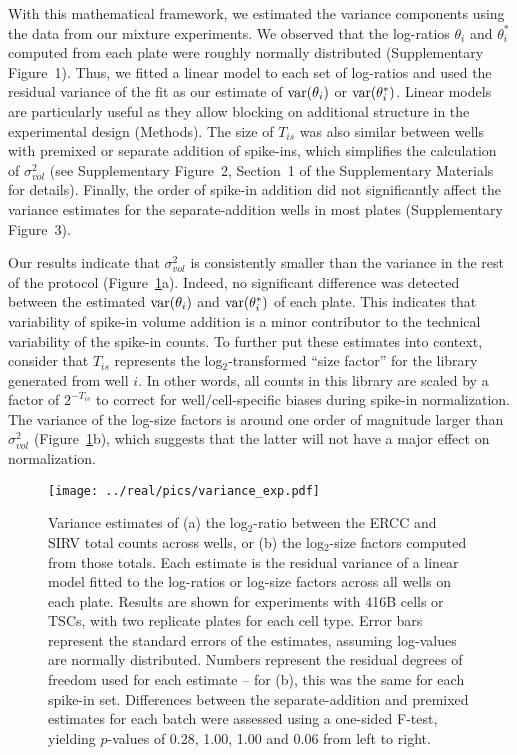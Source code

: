 \documentclass{article}
\newcommand{\suppfignorm}{1}
\newcommand{\suppfigtotals}{2}
\newcommand{\suppfigorder}{3}
\newcommand{\suppsecmath}{1}
\begin{document}
With this mathematical framework, we estimated the variance components using the data from our mixture experiments.
We observed that the log-ratios $\theta_i$ and $\theta^*_i$ computed from each plate were roughly normally distributed (Supplementary Figure~\suppfignorm{}).
Thus, we fitted a linear model to each set of log-ratios and used the residual variance of the fit as our estimate of $\mbox{var}(\theta_i)$ or $\mbox{var}(\theta^*_i)$.
Linear models are particularly useful as they allow blocking on additional structure in the experimental design (Methods).
The size of $T_{is}$ was also similar between wells with premixed or separate addition of spike-ins, which simplifies the calculation of $\sigma^2_{vol}$ (see Supplementary Figure~\suppfigtotals{}, Section~\suppsecmath{} of the Supplementary Materials for details).
Finally, the order of spike-in addition did not significantly affect the variance estimates for the separate-addition wells in most plates (Supplementary Figure~\suppfigorder{}).

Our results indicate that $\sigma^2_{vol}$ is consistently smaller than the variance in the rest of the protocol (Figure~\ref{fig:varestimates}a).
Indeed, no significant difference was detected between the estimated $\mbox{var}(\theta_i)$ and $\mbox{var}(\theta^*_i)$ of each plate.
This indicates that variability of spike-in volume addition is a minor contributor to the technical variability of the spike-in counts.
To further put these estimates into context, consider that $T_{is}$ represents the log$_2$-transformed ``size factor'' for the library generated from well $i$.
In other words, all counts in this library are scaled by a factor of $2^{-T_{is}}$ to correct for well/cell-specific biases during spike-in normalization.
The variance of the log-size factors is around one order of magnitude larger than $\sigma^2_{vol}$ (Figure~\ref{fig:varestimates}b), which suggests that the latter will not have a major effect on normalization.

\begin{figure}[btp]
    \begin{center}
        \texttt{[image: ../real/pics/variance\_exp.pdf]}
    \end{center}
    \caption{Variance estimates of (a) the log$_2$-ratio between the ERCC and SIRV total counts across wells, or (b) the log$_2$-size factors computed from those totals.
        Each estimate is the residual variance of a linear model fitted to the log-ratios or log-size factors across all wells on each plate.
        Results are shown for experiments with 416B cells or TSCs, with two replicate plates for each cell type.
        Error bars represent the standard errors of the estimates, assuming log-values are normally distributed.
        Numbers represent the residual degrees of freedom used for each estimate -- for (b), this was the same for each spike-in set.
        Differences between the separate-addition and premixed estimates for each batch were assessed using a one-sided F-test, yielding $p$-values of 0.28, 1.00, 1.00 and 0.06 from left to right.
    }
    \label{fig:varestimates}
\end{figure}
\end{document}
